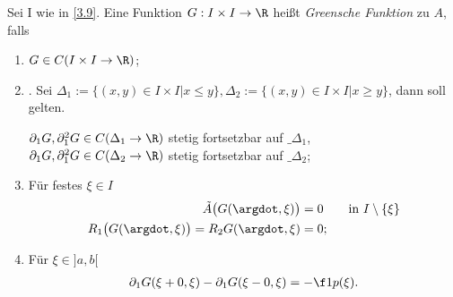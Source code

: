 \begin{df} \label{3.11}
	Sei I wie in \ref{3.9}. Eine Funktion $G: I \times I \to \R$ heißt \emph{Greensche Funktion} zu $A$, falls
	\begin{enumerate}[1)]
		\item
			$G \in C(I\times I \to \R)$;
		\item
			.
			Sei $\Delta_1:=\{(x,y)\in I \times I | x \le y\}, \Delta_2:=\{(x,y)\in I \times I | x \ge y\}$, dann soll gelten.

			$\partial_1 G, \partial_1^2 G \in C(\Delta_1 \to \R)$ stetig fortsetzbar auf $\_{\Delta_1}$, \\
			$\partial_1 G, \partial_1^2 G \in C(\Delta_2 \to \R)$ stetig fortsetzbar auf $\_{\Delta_2}$;
		\item
			Für festes $\xi \in I$
			\begin{align*}
				\tilde A \big(G(\argdot, \xi)\big) &= 0 \qquad \text{in $I \setminus \{\xi\}$} \\
				R_1 \big(G(\argdot, \xi)\big ) = R_2 G(\argdot, \xi) &= 0;
			\end{align*}
		\item
			Für $\xi \in ]a,b[$
			\begin{align*}
				\partial_1 G (\xi + 0, \xi) - \partial_1 G(\xi - 0, \xi) = -\f 1{p(\xi)}.
			\end{align*}
	\end{enumerate}
\end{df}

